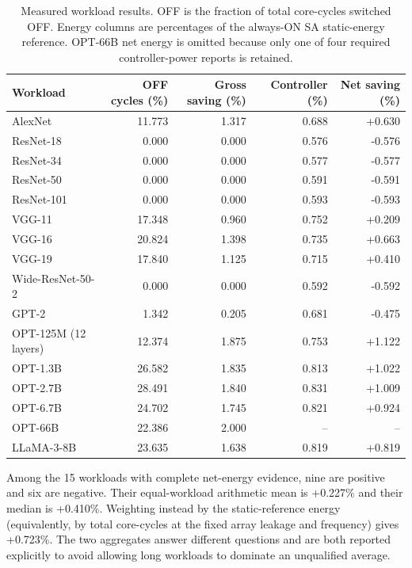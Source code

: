 \begin{table}[t]
  \centering
  \caption{Measured workload results.  OFF is the fraction of total
  core-cycles switched OFF.  Energy columns are percentages of the always-ON
  SA static-energy reference.  OPT-66B net energy is omitted because only one
  of four required controller-power reports is retained.}
  \label{tab:workload-energy}
  \begin{tabular}{lrrrr}
    \toprule
    Workload & OFF cycles (\%) & Gross saving (\%) & Controller (\%) & Net saving (\%) \\
    \midrule
    AlexNet             & 11.773 & 1.317 & 0.688 & +0.630 \\
    ResNet-18           &  0.000 & 0.000 & 0.576 & -0.576 \\
    ResNet-34           &  0.000 & 0.000 & 0.577 & -0.577 \\
    ResNet-50           &  0.000 & 0.000 & 0.591 & -0.591 \\
    ResNet-101          &  0.000 & 0.000 & 0.593 & -0.593 \\
    VGG-11              & 17.348 & 0.960 & 0.752 & +0.209 \\
    VGG-16              & 20.824 & 1.398 & 0.735 & +0.663 \\
    VGG-19              & 17.840 & 1.125 & 0.715 & +0.410 \\
    Wide-ResNet-50-2    &  0.000 & 0.000 & 0.592 & -0.592 \\
    GPT-2               &  1.342 & 0.205 & 0.681 & -0.475 \\
    OPT-125M (12 layers)& 12.374 & 1.875 & 0.753 & +1.122 \\
    OPT-1.3B            & 26.582 & 1.835 & 0.813 & +1.022 \\
    OPT-2.7B            & 28.491 & 1.840 & 0.831 & +1.009 \\
    OPT-6.7B            & 24.702 & 1.745 & 0.821 & +0.924 \\
    OPT-66B             & 22.386 & 2.000 & --    & -- \\
    LLaMA-3-8B          & 23.635 & 1.638 & 0.819 & +0.819 \\
    \bottomrule
  \end{tabular}
\end{table}

Among the 15 workloads with complete net-energy evidence, nine are positive
and six are negative.  Their equal-workload arithmetic mean is +0.227\% and
their median is +0.410\%.  Weighting instead by the static-reference energy
(equivalently, by total core-cycles at the fixed array leakage and frequency)
gives +0.723\%.  The two aggregates answer different questions and are both
reported explicitly to avoid allowing long workloads to dominate an
unqualified average.

